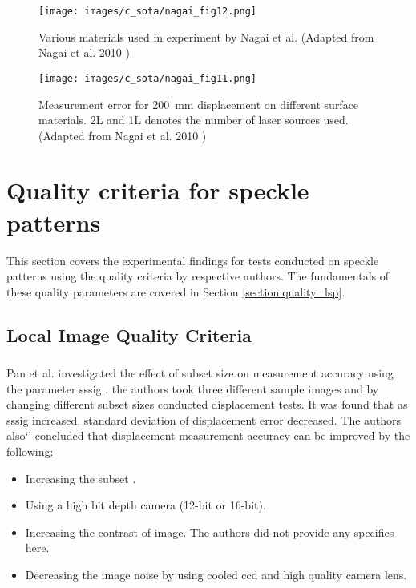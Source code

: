     \begin{figure}[h]
        \centering
        \texttt{[image: images/c\_sota/nagai\_fig12.png]}
        \caption{Various materials used in experiment by Nagai et al. (Adapted from Nagai et al. 2010 \cite{nagai})}
        \label{fig:nagai_fig12}
    \end{figure}

    \begin{figure}[h]
        \centering
        \texttt{[image: images/c\_sota/nagai\_fig11.png]}
        \caption{Measurement error for \SI{200}{\milli\meter} displacement on different surface materials. 2L and 1L denotes the number of laser sources used. (Adapted from Nagai et al. 2010 \cite{nagai})}
        \label{fig:nagai_fig11}
    \end{figure}

    
\section{Quality criteria for speckle patterns}
    This section covers the experimental findings for tests conducted on speckle patterns using the quality criteria by respective authors. The fundamentals of these quality parameters are covered in Section \ref{section:quality_lsp}.


\subsection{Local Image Quality Criteria}

    \subsubsection{}\label{subsubsection:sssig}
        Pan et al. investigated the effect of subset size on measurement accuracy using the parameter \gls{sssig} \cite{pan_subset}. the authors took three different sample images and by changing different subset sizes conducted displacement tests. It was found that as \gls{sssig} increased, standard deviation of displacement error decreased. The authors also`' concluded that displacement measurement accuracy can be improved by the following:
        \begin{itemize}
            \item Increasing the subset .
            \item Using a high bit depth camera (12-bit or 16-bit).
            \item Increasing the contrast of image. The authors did not provide any specifics here.
            \item Decreasing the image noise by using cooled \gls{ccd} and high quality camera lens.
        \end{itemize}

